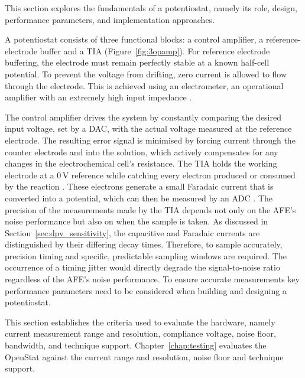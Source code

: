 This section explores the fundamentals of a potentiostat, namely its role, design, performance parameters, and implementation approaches.

\label{sec:role_potentiostat}

A potentiostat consists of three functional blocks: a control amplifier, a reference-electrode buffer and a TIA (Figure~\ref{fig:3opamp}). For reference electrode buffering, the electrode must remain perfectly stable at a known half-cell potential. To prevent the voltage from drifting, zero current is allowed to flow through the electrode. This is achieved using an electrometer, an operational amplifier with an extremely high input impedance \cite{iest2026threeelectrode}.

The control amplifier drives the system by constantly comparing the desired input voltage, set by a DAC, with the actual voltage measured at the reference electrode. The resulting error signal is minimised by forcing current through the counter electrode and into the solution, which actively compensates for any changes in the electrochemical cell's resistance. The TIA holds the working electrode at a 0\,V reference while catching every electron produced or consumed by the reaction \cite{bard2001}. These electrons generate a small Faradaic current that is converted into a potential, which can then be measured by an \ac{ADC} \cite{bard2001}. The precision of the measurements made by the TIA depends not only on the AFE's noise performance but also on when the sample is taken. As discussed in Section~\ref{sec:dpv_sensitivity}, the capacitive and Faradaic currents are distinguished by their differing decay times. Therefore, to sample accurately, precision timing and specific, predictable sampling windows are required. The occurrence of a timing jitter would directly degrade the signal-to-noise ratio regardless of the AFE's noise performance. To ensure accurate measurements key performance parameters need to be considered when building and designing a potentiostat.

\label{sec:key_performance_parameters}

This section establishes the criteria used to evaluate the hardware, namely current
measurement range and resolution, compliance voltage, noise floor, bandwidth, and
technique support. Chapter~\ref{chap:testing} evaluates the OpenStat against the current
range and resolution, noise floor and technique support.

